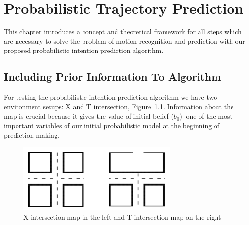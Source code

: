 \chapter{Probabilistic Trajectory Prediction}
\label{chap:2}
%
This chapter introduces a concept and theoretical framework for all steps which are necessary to solve the problem of motion recognition and prediction with our proposed probabilistic intention prediction algorithm. 

\section{Including Prior Information To Algorithm}

For testing the probabilistic intention prediction algorithm we have two environment setups: X and T intersection, Figure~\ref{fig:XandT}. Information about the map is crucial because it gives the value of initial belief ($b_{0}$), one of the most important variables of our initial probabilistic model at the beginning of prediction-making. 

\begin{figure}[H]
	\centering  	
	\includegraphics[width=8cm]{img/XandT.png}
	\caption{X intersection map in the left and T intersection map on the right}
	\label{fig:XandT}    
\end{figure}

